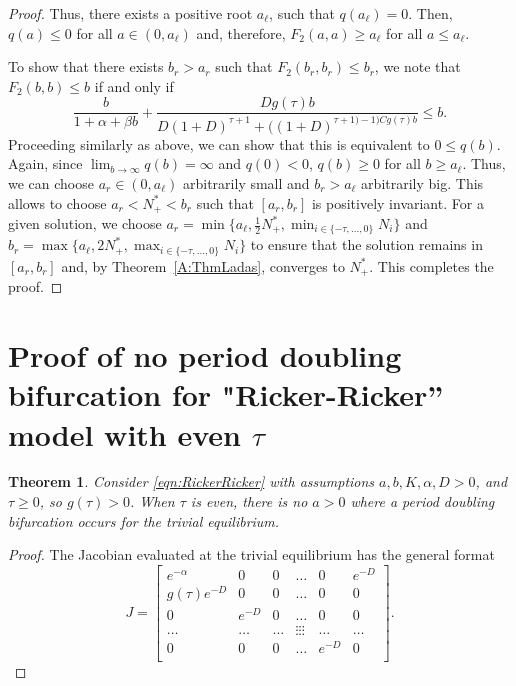 \documentclass{article}
\newtheorem{theorem}{Theorem}
\numberwithin{theorem}{section}
\begin{document}
{\begin{proof}
 Thus, there exists a positive root $a_\ell$, such that $q(a_\ell)=0$. Then,  $q(a)\leq 0$ for all $a\in (0, a_\ell)$ and, therefore, $F_2(a,a)\geq a_\ell$ for all $a\leq a_\ell$.  

To show that there exists $b_r>a_r$ such that $F_2(b_r, b_r)\leq b_r$, we note that $F_2(b,b)\leq b$ if and only if 
$$\frac{b}{1+\alpha+\beta b}+\frac{Dg(\tau)b}{D(1+D)^{\tau+1}+((1+D)^{\tau+1)-1)Cg(\tau)b}}\leq b. $$
Proceeding similarly as above, we can show that this is equivalent to 
$0\leq q(b)$. 
Again, since $\lim_{b\to \infty}q(b)=\infty$ and $q(0)<0$, 
$q(b)\geq 0$ for all $b\geq a_\ell$. Thus, we can choose $a_r\in (0, a_\ell)$ arbitrarily small and $b_r>a_\ell$ arbitrarily big.  This allows to choose $a_r<N^*_+<b_r$ such that $[a_r, b_r]$ is positively invariant. For a given solution, we choose $a_r=\min\{a_\ell, \frac{1}{2}N^*_+, \min_{i\in \{-\tau, \ldots, 0\}}N_i\}$ and $b_r=\max\{a_\ell, 2N^*_+, \max_{i\in \{-\tau, \ldots, 0\}}N_i\}$ to ensure that the solution remains in $[a_r, b_r]$ and, by Theorem~\ref{A:ThmLadas}, converges to $N^*_+$. This completes the proof. 
\end{proof}


\section{Proof of no period doubling bifurcation for "Ricker-Ricker'' model with even $\tau$}\label{A:thmRR_PD}
\begin{theorem}\label{thm:RR_PD}
     Consider \eqref{eqn:RickerRicker} with assumptions $a,b,K,\alpha,D>0$, and $\tau\geq0$, so $g(\tau)>0$. When $\tau$ is even, there is no $a>0$ where a period doubling bifurcation occurs for the trivial equilibrium.
\end{theorem}
\begin{proof}
   The Jacobian evaluated at the trivial equilibrium has the general format
\begin{equation*} 
 J=\begin{bmatrix}
e^{-\alpha} & 0 & 0 & \ldots & 0 & e^{-D}\\
 g(\tau)e^{-D} & 0 & 0 & \ldots & 0 & 0\\
0 & e^{-D} & 0 & \ldots & 0 & 0\\
\ldots & \ldots & \ldots & \vdots\vdots\vdots & \ldots & \ldots\\
0 & 0 & 0 & \ldots & e^{-D} & 0\\
\end{bmatrix}.
\end{equation*}


\end{proof}}
\end{document}
